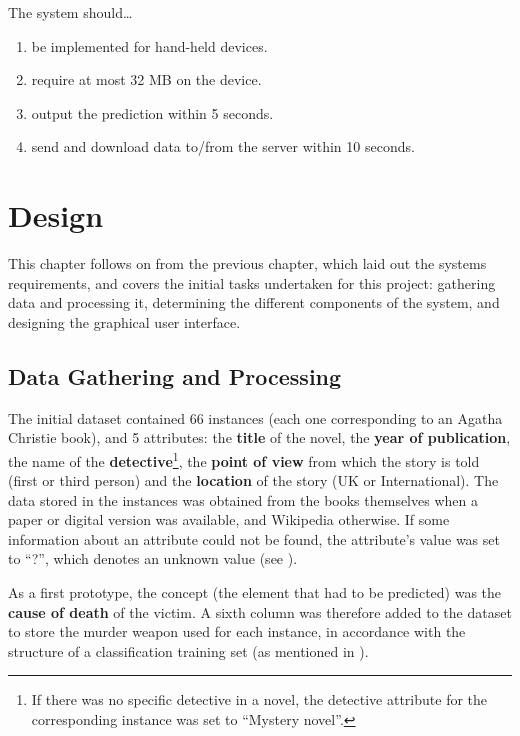 \documentclass{mproj}
\begin{document}
The system should\ldots
\begin{enumerate}[topsep=0pt]\label{constraints}
	\item be implemented for hand-held devices.
	\item require at most 32 MB on the device.
	\item output the prediction within 5 seconds.
	\item send and download data to/from the server within 10 seconds.
\end{enumerate}


\chapter{Design}

This chapter follows on from the previous chapter, which laid out the systems requirements, and covers the initial tasks undertaken for this project: gathering data and processing it, determining the different components of the system, and designing the graphical user interface. \par

\section{Data Gathering and Processing}\label{data_process}

The initial dataset contained 66 instances (each one corresponding to an Agatha Christie book), and 5 attributes: the \textbf{title} of the novel, the \textbf{year of publication}, the name of the \textbf{detective}\footnote{If there was no specific detective in a novel, the detective attribute for the corresponding instance was set to ``Mystery novel''.}, the \textbf{point of view} from which the story is told (first or third person) and the \textbf{location} of the story (UK or International). The data stored in the instances was obtained from the books themselves when a paper or digital version was available, and Wikipedia otherwise. \cite{wikipedia} If some information about an attribute could not be found, the attribute's value was set to ``?'', which denotes an unknown value (see ).\par

As a first prototype, the concept (the element that had to be predicted) was the \textbf{cause of death} of the victim. A sixth column was therefore added to the dataset to store the murder weapon used for each instance, in accordance with the structure of a classification training set (as mentioned in ).\par
\end{document}
